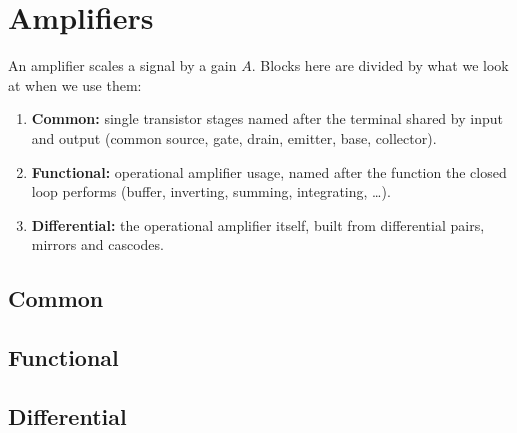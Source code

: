 \chapter{Amplifiers}\label{ch:amplifiers}

An amplifier scales a signal by a gain \(A\). Blocks here are divided by
what we look at when we use them:
\begin{enumerate}
  \item \textbf{Common:} single transistor stages named after the
    terminal shared by input and output (common source, gate, drain,
    emitter, base, collector).
  \item \textbf{Functional:} operational amplifier usage, named after the
    function the closed loop performs (buffer, inverting, summing,
    integrating, \ldots).
  \item \textbf{Differential:} the operational amplifier itself, built
    from differential pairs, mirrors and cascodes.
\end{enumerate}


\section{Common}\label{sec:amp_common}







\section{Functional}\label{sec:amp_functional}








\section{Differential}\label{sec:amp_differential}









